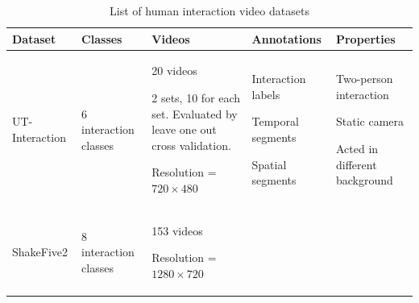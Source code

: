 \begin{table}
	\caption{List of human interaction video datasets}
	\begin{center}
		\begin{tabular}{| p{2.5cm} | p{1.5cm} | p{4cm} | p{3cm} | p{3cm} |}
			\hline
			Dataset & Classes & Videos & Annotations & Properties \\ \hline \hline
			
			UT-Interaction\cite{ut2010}
			& %
			6 interaction classes
			& %
			\vspace{-5mm}
			\begin{myitemize}
				\item 20 videos
				\item 2 sets, 10 for each set. Evaluated by leave one out cross validation.
				\item Resolution = \(720 \times 480\)
			\end{myitemize}
			
			& %
			\vspace{-5mm}
			\begin{myitemize}
				\item Interaction labels
				\item Temporal segments
				\item Spatial segments
			\end{myitemize}
			& %
			\vspace{-5mm}
			\begin{myitemize}
				\item Two-person interaction
				\item Static camera
				\item Acted in different background
			\end{myitemize}
			\\ \hline
			
			ShakeFive2\cite{shakefive2}
			& %
			8 interaction classes
			& %
			\vspace{-5mm}
			\begin{myitemize}
				\item 153 videos
				\item Resolution = \(1280 \times 720\)
			\end{myitemize}
			

\end{tabular}
\end{center}
\end{table}
